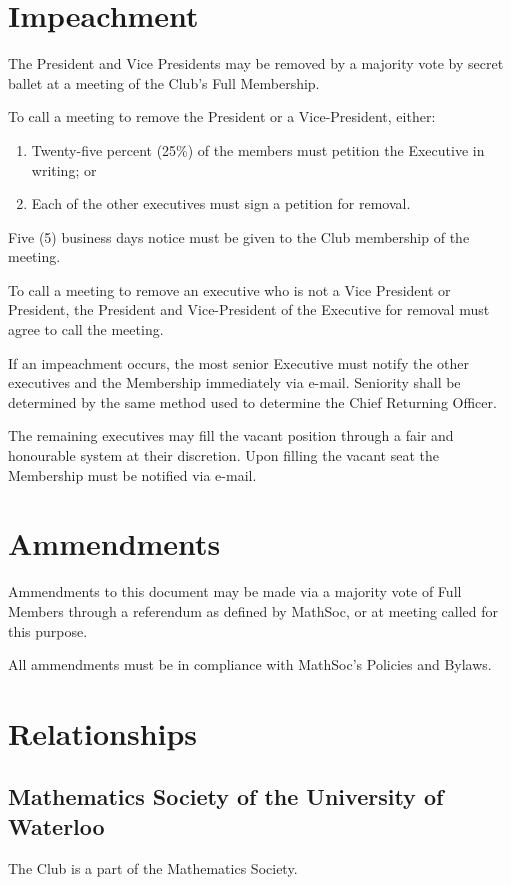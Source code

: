 \documentclass[11pt]{mathsoc}
\begin{document}
\section{Impeachment}
The President and Vice Presidents may be removed by a majority vote by 
secret ballet at a meeting of the Club's Full Membership.

To call a meeting to remove the President or a Vice-President, either:
\begin{enumerate}
    \item Twenty-five percent (25\%) of the members must petition the 
        Executive in writing; or
    \item Each of the other executives must sign a petition for removal. 
\end{enumerate}

Five (5) business days notice must be given to the Club membership of the
meeting. 

To call a meeting to remove an executive who is not a Vice President or 
President, the President and Vice-President of the Executive for removal must 
agree to call the meeting.

If an impeachment occurs, the most senior Executive must notify the other 
executives and the Membership immediately via e-mail. Seniority shall be 
determined by the same method used to determine the Chief Returning
Officer.

The remaining executives may fill the vacant position through a fair and 
honourable system at their discretion. Upon filling the vacant seat the 
Membership must be notified via e-mail.

\section{Ammendments}
Ammendments to this document may be made via a majority vote of Full Members 
through a referendum as defined by MathSoc, or at meeting called for this purpose.  

All ammendments must be in compliance with MathSoc's Policies and Bylaws.

\section{Relationships}

\subsection{Mathematics Society of the University of Waterloo}
The Club is a part of the Mathematics Society.
\end{document}
